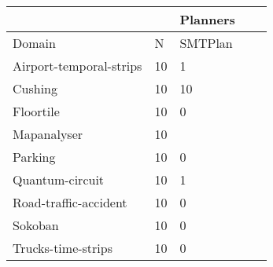 \begin{table}[]
\begin{tabular}{|l|l|l|l|l|}
\hline
                        &    & Planners &  &  \\ \hline
Domain                  & N  & SMTPlan  &  &  \\ \hline
Airport-temporal-strips & 10 & 1        &  &  \\ \hline
Cushing                 & 10 & 10       &  &  \\ \hline
Floortile               & 10 & 0        &  &  \\ \hline
Mapanalyser             & 10 &          &  &  \\ \hline
Parking                 & 10 & 0        &  &  \\ \hline
Quantum-circuit         & 10 & 1        &  &  \\ \hline
Road-traffic-accident   & 10 & 0        &  &  \\ \hline
Sokoban                 & 10 & 0        &  &  \\ \hline
Trucks-time-strips      & 10 & 0        &  &  \\ \hline
\end{tabular}
\end{table}